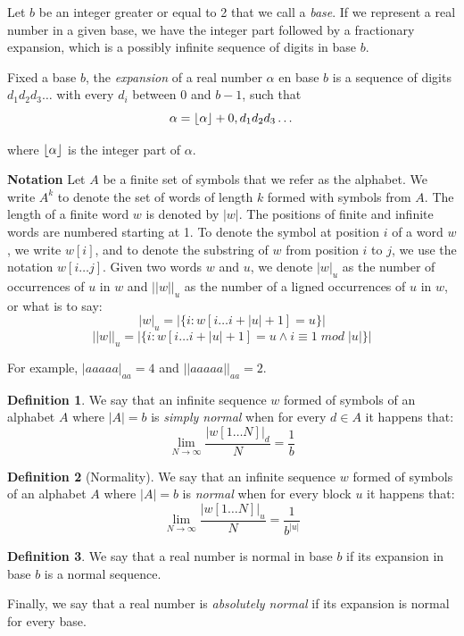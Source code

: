 \documentclass[11pt,a4paper]{tesis}
\theoremstyle{definition}
\newtheorem{definition}{Definition}[section]
\DeclarePairedDelimiter{\floor}{\lfloor}{\rfloor}
\begin{document}
Let $b$ be an integer greater or equal to 2 that we call a \textit{base}. If we represent a real number in a given base, we have the integer part followed by a fractionary expansion, which is a possibly infinite sequence of digits in base $b$.

Fixed a base $b$, the \textit{expansion} of a real number $\alpha$ en base $b$ is a sequence of digits $d_1d_2d_3\dots$ with every $d_i$ between 0 and $b-1$, such that
$$\alpha = \floor{\alpha} + 0,d_1d_2d_3\dots$$

where $\floor{\alpha}$ is the integer part of $\alpha$.

\textbf{Notation}
Let $A$ be a finite set of symbols that we refer as the alphabet. We write $A^k$ to denote the set of words of length $k$ formed with symbols from $A$. The length of a finite word $w$ is denoted by $|w|$.
The positions of finite and infinite words are numbered starting at 1. To denote the symbol at position $i$ of a word $w$, we write $w[i]$, and to denote the substring of $w$ from position $i$ to $j$, we use the notation $w[i \dots j]$.  
Given two words $w$ and $u$, we denote $|w|_u$ as the number of occurrences of $u$ in $w$ and $||w||_u$ as the number of a
ligned occurrences of $u$ in $w$, or what is to say:
    $$|w|_u = |\{i: w[i \dots i + |u| + 1] = u\}|$$
    $$||w||_u = |\{i: w[i \dots i + |u| + 1] = u \wedge i \equiv 1 \; mod \; |u| \}|$$

For example, $|aaaaa|_{aa} = 4$ and $||aaaaa||_{aa} = 2$.
\\

\begin{definition}
    We say that an infinite sequence $w$ formed of symbols of an alphabet $A$ where $|A| = b$ is \textit{simply normal} when for every $d \in A$ it happens that:
    $$\lim_{N\to\infty} \frac{|w[1 \dots N]|_d}{N} = \frac{1}{b}$$
\end{definition}

\begin{definition}[Normality]
    We say that an infinite sequence $w$ formed of symbols of an alphabet $A$ where $|A| = b$ is \textit{normal} when for every block $u$ it happens that:
    $$\lim_{N\to\infty} \frac{|w[1 \dots N]|_u}{N} = \frac{1}{b^{|u|}}$$
\end{definition}

\begin{definition}
    We say that a real number is normal in base $b$ if its expansion in base $b$ is a normal sequence. 
    
    Finally, we say that a real number is \textit{absolutely normal} if its expansion is normal for every base.
\end{definition}
\end{document}
